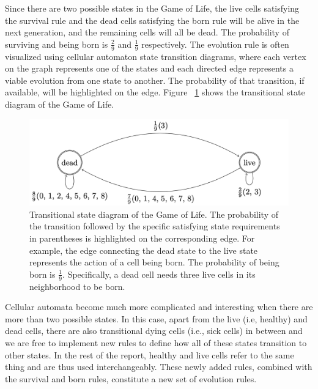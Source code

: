 \documentclass[12pt]{article}
\numberwithin{figure}{section} %
\begin{document}
Since there are two possible states in the Game of Life, the live cells satisfying the survival rule and the dead cells satisfying the born rule will be alive in the next generation, and the remaining cells will all be dead. The probability of surviving and being born is $\frac{2}{9}$ and $\frac{1}{9}$ respectively. The evolution rule is often visualized using cellular automaton state transition diagrams, where each vertex on the graph represents one of the states and each directed edge represents a viable evolution from one state to another. The probability of that transition, if available, will be highlighted on the edge. Figure ~\ref{fig:Transitional state diagram of the Game of Life} shows the transitional state diagram of the Game of Life. 

\begin{figure}[H]
	\centering
	\includegraphics[width=\linewidth]{Section1/3}
	\caption[Transitional state diagram of the Game of Life]{Transitional state diagram of the Game of Life. The probability of the transition followed by the specific satisfying state requirements in parentheses is highlighted on the corresponding edge. For example, the edge connecting the dead state to the live state represents the action of a cell being born. The probability of being born is $\frac{1}{9}$. Specifically, a dead cell needs three live cells in its neighborhood to be born.}
	\label{fig:Transitional state diagram of the Game of Life}
	\vspace{-1.5em}
\end{figure}

Cellular automata become much more complicated and interesting when there are more than two possible states. In this case, apart from the live (i.e, healthy) and dead cells, there are also transitional dying cells (i.e., sick cells) in between and we are free to implement new rules to define how all of these states transition to other states. In the rest of the report, healthy and live cells refer to the same thing and are thus used interchangeably. These newly added rules, combined with the survival and born rules, constitute a new set of evolution rules. 
\end{document}
